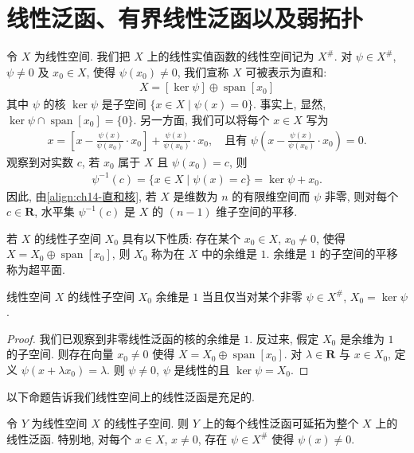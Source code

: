\documentclass[../../main.tex]{subfiles}
\begin{document}
\section{线性泛函、有界线性泛函以及弱拓扑}\label{section:ch14-线性泛函弱拓扑}

令 $X$ 为线性空间. 我们把 $X$ 上的线性实值函数的线性空间记为 $X^{\#}$. 对 $\psi\in X^{\#}$, $\psi\neq 0$ 及 $x_{0}\in X$, 使得 $\psi(x_{0})\neq 0$, 我们宣称 $X$ 可被表示为直和:
\begin{align}
X=[\ker\psi]\oplus\operatorname{span}[x_{0}]\label{align:ch14-直和核}
\end{align}
其中 $\psi$ 的核 $\ker\psi$ 是子空间 $\{x\in X\mid\psi(x)=0\}$. 事实上, 显然, $\ker\psi\cap\operatorname{span}[x_{0}]=\{0\}$. 另一方面, 我们可以将每个 $x\in X$ 写为
\begin{align*}
x=\left[x-\frac{\psi(x)}{\psi(x_{0})}\cdot x_{0}\right]+\frac{\psi(x)}{\psi(x_{0})}\cdot x_{0},\quad\text{且有 }\psi\left(x-\frac{\psi(x)}{\psi(x_{0})}\cdot x_{0}\right)=0.
\end{align*}
观察到对实数 $c$, 若 $x_{0}$ 属于 $X$ 且 $\psi(x_{0})=c$, 则
\begin{align*}
\psi^{-1}(c)=\{x\in X\mid\psi(x)=c\}=\ker\psi+x_{0}.
\end{align*}
因此, 由\eqref{align:ch14-直和核}, 若 $X$ 是维数为 $n$ 的有限维空间而 $\psi$ 非零, 则对每个 $c\in\mathbf{R}$, 水平集 $\psi^{-1}(c)$ 是 $X$ 的 $(n-1)$ 维子空间的平移.

若 $X$ 的线性子空间 $X_{0}$ 具有以下性质: 存在某个 $x_{0}\in X$, $x_{0}\neq 0$, 使得 $X=X_{0}\oplus\operatorname{span}[x_{0}]$, 则 $X_{0}$ 称为在 $X$ 中的余维是 $1$. 余维是 $1$ 的子空间的平移称为超平面.

\begin{proposition}\label{proposition:ch14-余维1}
线性空间 $X$ 的线性子空间 $X_{0}$ 余维是 $1$ 当且仅当对某个非零 $\psi\in X^{\#}$, $X_{0}=\ker\psi$.
\end{proposition}

\begin{proof}
我们已观察到非零线性泛函的核的余维是 $1$. 反过来, 假定 $X_{0}$ 是余维为 $1$ 的子空间. 则存在向量 $x_{0}\neq 0$ 使得 $X=X_{0}\oplus\operatorname{span}[x_{0}]$. 对 $\lambda\in\mathbf{R}$ 与 $x\in X_{0}$, 定义 $\psi(x+\lambda x_{0})=\lambda$. 则 $\psi\neq 0$, $\psi$ 是线性的且 $\ker\psi=X_{0}$.
\end{proof}

以下命题告诉我们线性空间上的线性泛函是充足的.

\begin{proposition}\label{proposition:ch14-延拓线性泛函}
令 $Y$ 为线性空间 $X$ 的线性子空间. 则 $Y$ 上的每个线性泛函可延拓为整个 $X$ 上的线性泛函. 特别地, 对每个 $x\in X$, $x\neq 0$, 存在 $\psi\in X^{\#}$ 使得 $\psi(x)\neq 0$.
\end{proposition}
\end{document}
